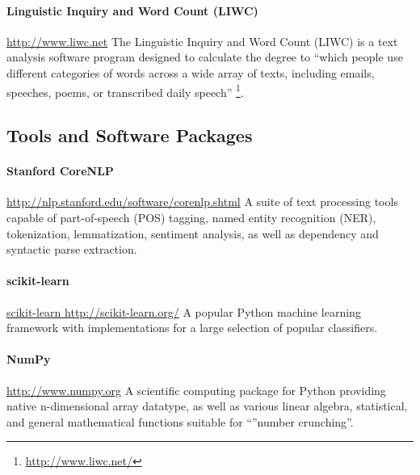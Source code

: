 \documentclass[
10pt, %
a4paper, %
oneside, %
headinclude,footinclude, %
BCOR5mm, %
]{scrartcl}
\begin{document}
\paragraph{\textbf{Linguistic Inquiry and Word Count (LIWC)}}
\hfill \newline \noindent \url{http://www.liwc.net}
\hfill \newline \noindent The Linguistic Inquiry and Word Count (LIWC) is a text
analysis software program designed to calculate the degree to ``which people use 
different categories of words across a wide array of texts, including emails, 
speeches, poems, or transcribed daily speech''
\footnote{\url{http://www.liwc.net/}}.

\subsection{Tools and Software Packages}

\paragraph{\textbf{Stanford CoreNLP}}
\hfill \newline \noindent \url{http://nlp.stanford.edu/software/corenlp.shtml}
\hfill \newline \noindent A suite of text processing tools capable of part-of-speech (POS) tagging, named
entity recognition (NER), tokenization, lemmatization, sentiment analysis, as
well as dependency and syntactic parse extraction.

\paragraph{\textbf{scikit-learn}}
\hfill \newline \noindent \url{scikit-learn http://scikit-learn.org/}
\hfill \newline \noindent A popular Python machine learning framework with
implementations for a large selection of popular classifiers.

\paragraph{\textbf{NumPy}}
\hfill \newline \noindent \url{http://www.numpy.org}
\hfill \newline \noindent A scientific computing package for Python providing 
native n-dimensional array datatype, as well as various linear algebra, 
statistical, and general mathematical functions suitable for ``''number crunching''.
\end{document}
